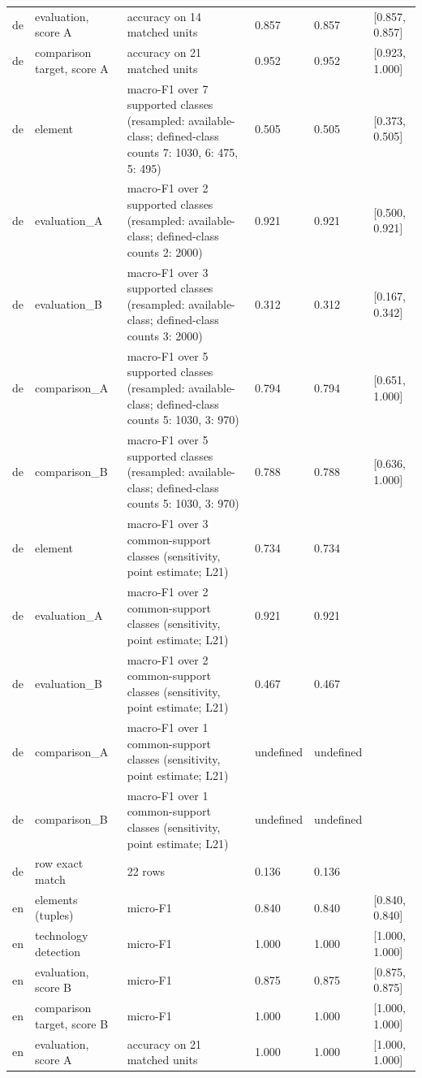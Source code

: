\begin{table}[htbp]
\begin{tabular}{llllll}
de & evaluation, score A & accuracy on 14 matched units & 0.857 & 0.857 & [0.857, 0.857] \\
de & comparison target, score A & accuracy on 21 matched units & 0.952 & 0.952 & [0.923, 1.000] \\
de & element & macro-F1 over 7 supported classes (resampled: available-class; defined-class counts {7: 1030, 6: 475, 5: 495}) & 0.505 & 0.505 & [0.373, 0.505] \\
de & evaluation\_A & macro-F1 over 2 supported classes (resampled: available-class; defined-class counts {2: 2000}) & 0.921 & 0.921 & [0.500, 0.921] \\
de & evaluation\_B & macro-F1 over 3 supported classes (resampled: available-class; defined-class counts {3: 2000}) & 0.312 & 0.312 & [0.167, 0.342] \\
de & comparison\_A & macro-F1 over 5 supported classes (resampled: available-class; defined-class counts {5: 1030, 3: 970}) & 0.794 & 0.794 & [0.651, 1.000] \\
de & comparison\_B & macro-F1 over 5 supported classes (resampled: available-class; defined-class counts {5: 1030, 3: 970}) & 0.788 & 0.788 & [0.636, 1.000] \\
de & element & macro-F1 over 3 common-support classes (sensitivity, point estimate; L21) & 0.734 & 0.734 &  \\
de & evaluation\_A & macro-F1 over 2 common-support classes (sensitivity, point estimate; L21) & 0.921 & 0.921 &  \\
de & evaluation\_B & macro-F1 over 2 common-support classes (sensitivity, point estimate; L21) & 0.467 & 0.467 &  \\
de & comparison\_A & macro-F1 over 1 common-support classes (sensitivity, point estimate; L21) & undefined & undefined &  \\
de & comparison\_B & macro-F1 over 1 common-support classes (sensitivity, point estimate; L21) & undefined & undefined &  \\
de & row exact match & 22 rows & 0.136 & 0.136 &  \\
en & elements (tuples) & micro-F1 & 0.840 & 0.840 & [0.840, 0.840] \\
en & technology detection & micro-F1 & 1.000 & 1.000 & [1.000, 1.000] \\
en & evaluation, score B & micro-F1 & 0.875 & 0.875 & [0.875, 0.875] \\
en & comparison target, score B & micro-F1 & 1.000 & 1.000 & [1.000, 1.000] \\
en & evaluation, score A & accuracy on 21 matched units & 1.000 & 1.000 & [1.000, 1.000] \\

\end{tabular}
\end{table}
